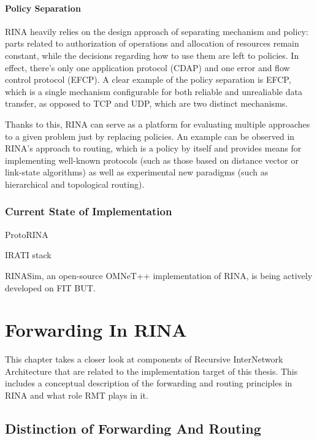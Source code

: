             \subsubsection{Policy Separation}

                RINA heavily relies on the design approach of separating mechanism and policy: parts related to authorization of operations and allocation of resources remain constant, while the decisions regarding how to use them are left to policies. In effect, there's only one application protocol (CDAP) and one error and flow control protocol (EFCP). A clear example of the policy separation is EFCP, which is a single mechanism configurable for both reliable and unrealiable data transfer, as opposed to TCP and UDP, which are two distinct mechanisms.

                Thanks to this, RINA can serve as a platform for evaluating multiple approaches to a given problem just by replacing policies. An example can be observed in RINA's approach to routing, which is a policy by itself and provides means for implementing well-known protocols (such as those based on distance vector or link-state algorithms) as well as experimental new paradigms (such as hierarchical and topological routing).

        \subsection{Current State of Implementation}

            ProtoRINA

            IRATI stack

            RINASim, an open-source OMNeT++ implementation of RINA, is being actively developed on FIT BUT.


\chapter{Forwarding In RINA}\label{forwarding}

    This chapter takes a closer look at components of Recursive InterNetwork Architecture that are related to the implementation target of this thesis. This includes a conceptual description of the forwarding and routing principles in RINA and what role RMT plays in it.

    \section{Distinction of Forwarding And Routing}


